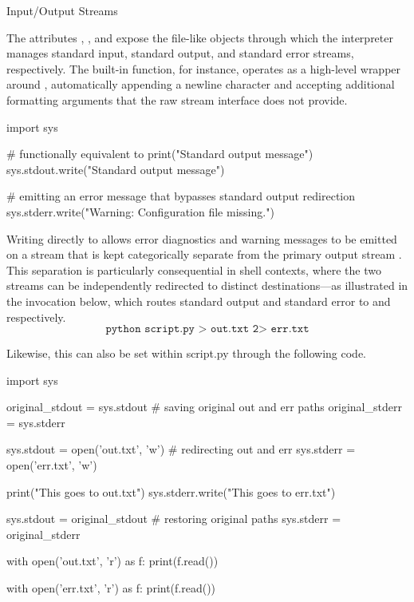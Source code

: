 \documentclass[10pt]{article}
\begin{document}
    \begin{core}[label=core:stdinouterr]{Input/Output Streams}

      The attributes , , and  expose the file-like objects through which the interpreter manages standard input, standard output, and standard error streams, respectively. The built-in  function, for instance, operates as a high-level wrapper around , automatically appending a newline character and accepting additional formatting arguments that the raw stream interface does not provide.

      \begin{pyconsole}

        import sys
        
        # functionally equivalent to print("Standard output message")
        sys.stdout.write("Standard output message\n")

        # emitting an error message that bypasses standard output redirection
        sys.stderr.write("Warning: Configuration file missing.\n")

      \end{pyconsole}

      Writing directly to  allows error diagnostics and warning messages to be emitted on a stream that is kept categorically separate from the primary output stream . This separation is particularly consequential in shell contexts, where the two streams can be independently redirected to distinct destinations---as illustrated in the invocation below, which routes standard output and standard error to  and  respectively.
      \[
        \texttt{python script.py > out.txt 2> err.txt}
      \]

      Likewise, this can also be set within script.py through the following code. 

      \begin{pyconsole}

        import sys

        original_stdout = sys.stdout # saving original out and err paths
        original_stderr = sys.stderr

        sys.stdout = open('out.txt', 'w') # redirecting out and err
        sys.stderr = open('err.txt', 'w')

        print("This goes to out.txt")
        sys.stderr.write("This goes to err.txt\n")

        sys.stdout = original_stdout # restoring original paths
        sys.stderr = original_stderr

        with open('out.txt', 'r') as f:
            print(f.read())

        with open('err.txt', 'r') as f:
            print(f.read())

      \end{pyconsole}

    \end{core}
\end{document}
